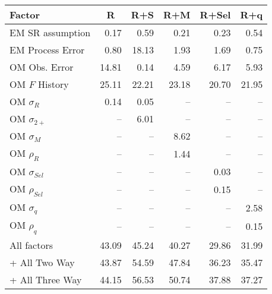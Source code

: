 \begin{center}
\begin{tabular}{lrrrrr}
\hline\hline
\multicolumn{1}{l}{Factor}&\multicolumn{1}{c}{R}&\multicolumn{1}{c}{R+S}&\multicolumn{1}{c}{R+M}&\multicolumn{1}{c}{R+Sel}&\multicolumn{1}{c}{R+q}\tabularnewline
\hline
EM SR assumption& 0.17& 0.59& 0.21& 0.23& 0.54\tabularnewline
EM Process Error& 0.80&18.13& 1.93& 1.69& 0.75\tabularnewline
OM Obs. Error&14.81& 0.14& 4.59& 6.17& 5.93\tabularnewline
OM $F$ History&25.11&22.21&23.18&20.70&21.95\tabularnewline
OM $\sigma_R$& 0.14& 0.05&--&--&--\tabularnewline
OM $\sigma_{2+}$ &--& 6.01&--&--&--\tabularnewline
OM $\sigma_M$&--&--& 8.62&--&--\tabularnewline
OM $\rho_R$&--&--& 1.44&--&--\tabularnewline
OM $\sigma_{Sel}$&--&--&--& 0.03&--\tabularnewline
OM $\rho_{Sel}$&--&--&--& 0.15&--\tabularnewline
OM $\sigma_q$&--&--&--&--& 2.58\tabularnewline
OM $\rho_q$&--&--&--&--& 0.15\tabularnewline
All factors&43.09&45.24&40.27&29.86&31.99\tabularnewline
+ All Two Way&43.87&54.59&47.84&36.23&35.47\tabularnewline
+ All Three Way&44.15&56.53&50.74&37.88&37.27\tabularnewline
\hline
\end{tabular}\end{center}

